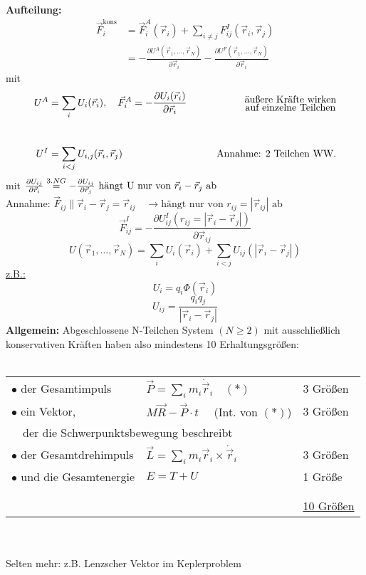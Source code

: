 \documentclass[titlepage,12pt,a4paper,ngerman]{report}
\newcommand{\tx}[1]{\textrm{#1}}
\begin{document}
\textbf{Aufteilung:}
\begin{align*}
\vec{F}^{\tx{kons}}_i &= \vec{F}_i^A (\vec{r}_i) + \sum_{i\neq j} F_{ij}^I (\vec{r}_i,\vec{r}_j)\\
&= -\frac{\partial U^A(\vec{r}_1,\dots , \vec{r}_N)}{\partial \vec{r}_i} - \frac{\partial U^F(\vec{r}_1,\dots , \vec{r}_N)}{\partial \vec{r}_i}
\end{align*}
mit 
\begin{align*}
U^A &= \sum_i U_i (\vec{r}_i), \quad \vec{F}^A_i = -\frac{\partial U_i(\vec{r}_i)}{\partial \vec{r}_i} \qquad &\begin{Large}\substack{\tx{äußere Kräfte wirken} \\ \tx{auf einzelne Teilchen}}\end{Large} \\\\
U^I &= \sum_{i < j} U_{i,j} (\vec{r}_i,\vec{r}_j) \qquad  & {\tx{Annahme: 2 Teilchen WW.}}
\end{align*}
mit $ \frac{\partial U_{ij}}{\partial \vec{r}_i} \buildrel 3.NG \over = -\frac{\partial U_{ij}}{\partial \vec{r}_j} \textrm{ hängt U nur von } \vec{r}_i - \vec{r}_j \textrm{ ab }$\\
Annahme: $\vec{F}_{ij} \parallel \vec{r}_i - \vec{r}_j = \vec{r}_{ij} \quad \rightarrow \textrm{hängt nur von } r_{ij} = | \vec{r}_{ij}| \textrm{ ab }$
$$ \vec{F}_{ij}^I = - \frac{\partial U^I_{ij} (r_{ij} = |\vec{r}_i - \vec{r}_j|)}{\partial \vec{r}_{ij}}$$
$$ U(\vec{r}_1 , \dots , \vec{r}_N) = \sum_i U_i (\vec{r}_i) + \sum _{i<j} U_{ij} (|\vec{r}_i- \vec{r}_j |)$$
\underline{z.B.:} $$U_i = q_i \Phi (\vec{r}_i)$$
$$U_{ij} = \frac{q_i q_j}{|\vec{r}_i - \vec{r}_j |}$$
\textbf{Allgemein:} Abgeschlossene N-Teilchen System $(N\ge 2)$ mit ausschließlich konservativen Kräften haben also mindestens 10 Erhaltungsgrößen:\\\\
\begin{tabular}{lll}
	$\bullet$ der Gesamtimpuls &  $\vec{P} = \sum_i m_i \dot{\vec{r}}_i \quad (*)$	& 3 Größen \\ 
	$\bullet$ ein Vektor, & $M\vec{R} - \vec{P} \cdot t\quad $ (Int. von $(*)$)	& 3 Größen \\ 
	\multicolumn{2}{l}{\ \,  der die Schwerpunktsbewegung beschreibt}  \\
	$\bullet$ der Gesamtdrehimpuls & $\vec{L} = \sum_i m_i \vec{r}_i \times \dot{\vec{r}}_i$	& 3 Größen \\ 
	$\bullet$ und die Gesamtenergie & $ E = T+U$	& 1 Größe \\
	\\[-10pt]
	\hline\\[-10pt]
	& & \underline{10 Größen}
\end{tabular} \\\\
Selten mehr: z.B. Lenzscher Vektor im Keplerproblem
\end{document}
